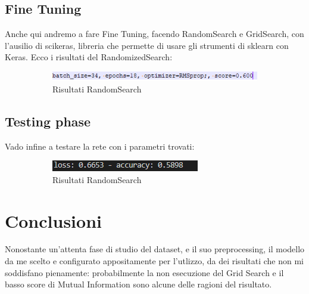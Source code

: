 \documentclass{article}
\begin{document}
\subsection{Fine Tuning}
Anche qui andremo a fare Fine Tuning, facendo RandomSearch e GridSearch, con l'ausilio di scikeras, libreria che permette di usare gli strumenti di sklearn con Keras.
Ecco i risultati del RandomizedSearch:
\begin{figure}[H]
 \centering
  \begin{subfigure}[b]{0.9\linewidth}
    \includegraphics[width=\linewidth]{RandomSearchKeras}
     \caption{Risultati RandomSearch}
  \end{subfigure}
  \caption{}
  \label{fig:image7}
\end{figure}
\subsection{Testing phase}
Vado infine a testare la rete con i parametri trovati:
\begin{figure}[H]
 \centering
  \begin{subfigure}[b]{0.9\linewidth}
    \includegraphics[width=\linewidth]{KerasTest}
     \caption{Risultati RandomSearch}
  \end{subfigure}
  \caption{}
  \label{fig:image8}
\end{figure}
\pagebreak

\section{Conclusioni}
Nonostante un'attenta fase di studio del dataset, e il suo preprocessing, il modello da me scelto e configurato appositamente per l'utlizzo, da dei risultati che non mi soddisfano pienamente: probabilmente la non esecuzione del Grid Search e il basso score di Mutual Information sono alcune delle ragioni del risultato. 



 
\end{document}
